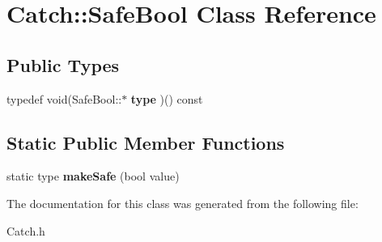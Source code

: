 \hypertarget{class_catch_1_1_safe_bool}{\section{Catch\-:\-:Safe\-Bool Class Reference}
\label{class_catch_1_1_safe_bool}
}
\subsection*{Public Types}
\begin{DoxyCompactItemize}
\item 
\hypertarget{class_catch_1_1_safe_bool_a14cd49eced5b255a1f59512d3b9395ae}{typedef void(Safe\-Bool\-::$\ast$ {\bfseries type} )() const }\label{class_catch_1_1_safe_bool_a14cd49eced5b255a1f59512d3b9395ae}

\end{DoxyCompactItemize}
\subsection*{Static Public Member Functions}
\begin{DoxyCompactItemize}
\item 
\hypertarget{class_catch_1_1_safe_bool_af0ea63d9820f8bf7a8b76377913c4e77}{static type {\bfseries make\-Safe} (bool value)}\label{class_catch_1_1_safe_bool_af0ea63d9820f8bf7a8b76377913c4e77}

\end{DoxyCompactItemize}


The documentation for this class was generated from the following file\-:\begin{DoxyCompactItemize}
\item 
Catch.\-h\end{DoxyCompactItemize}
